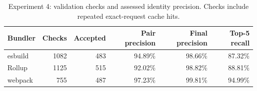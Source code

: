 \begin{table}[htbp]
\caption{Experiment 4: validation checks and assessed identity precision. Checks include repeated exact-request cache hits.}
\label{tab:exp4-validation}
\centering\small
\begin{tabular}{lrrrrr}
\toprule
Bundler & Checks & Accepted & Pair precision & Final precision & Top-5 recall\\
\midrule
esbuild & 1082 & 483 & 94.89\% & 98.66\% & 87.32\%\\
Rollup & 1125 & 515 & 92.02\% & 98.82\% & 88.81\%\\
webpack & 755 & 487 & 97.23\% & 99.81\% & 94.99\%\\
\bottomrule
\end{tabular}
\end{table}
